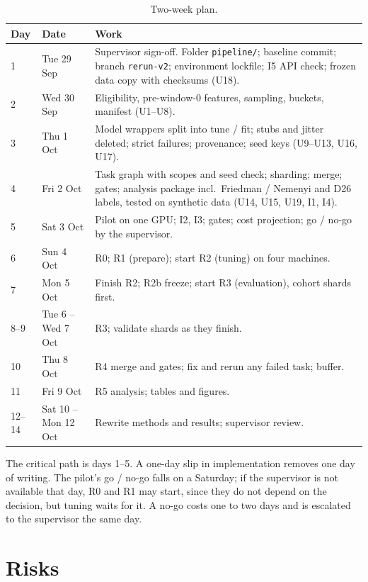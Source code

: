 \documentclass[11pt,a4paper]{article}
\newcommand{\code}[1]{\texttt{#1}}
\begin{document}
\begin{table}[h]
\centering\small
\caption{Two-week plan.}\label{tab:timeline}
\begin{tabularx}{\linewidth}{@{}l l X@{}}
\toprule
Day & Date & Work \\
\midrule
1 & Tue 29 Sep & Supervisor sign-off. Folder \code{pipeline/}; baseline commit; branch \code{rerun-v2}; environment lockfile; I5 API check; frozen data copy with checksums (U18). \\
2 & Wed 30 Sep & Eligibility, pre-window-0 features, sampling, buckets, manifest (U1--U8). \\
3 & Thu 1 Oct & Model wrappers split into tune / fit; stubs and jitter deleted; strict failures; provenance; seed keys (U9--U13, U16, U17). \\
4 & Fri 2 Oct & Task graph with scopes and seed check; sharding; merge; gates; analysis package incl.\ Friedman / Nemenyi and D26 labels, tested on synthetic data (U14, U15, U19, I1, I4). \\
5 & Sat 3 Oct & Pilot on one GPU; I2, I3; gates; cost projection; go / no-go by the supervisor. \\
6 & Sun 4 Oct & R0; R1 (prepare); start R2 (tuning) on four machines. \\
7 & Mon 5 Oct & Finish R2; R2b freeze; start R3 (evaluation), cohort shards first. \\
8--9 & Tue 6 -- Wed 7 Oct & R3; validate shards as they finish. \\
10 & Thu 8 Oct & R4 merge and gates; fix and rerun any failed task; buffer. \\
11 & Fri 9 Oct & R5 analysis; tables and figures. \\
12--14 & Sat 10 -- Mon 12 Oct & Rewrite methods and results; supervisor review. \\
\bottomrule
\end{tabularx}
\end{table}

The critical path is days 1--5. A one-day slip in implementation removes one day of writing. The
pilot's go / no-go falls on a Saturday; if the supervisor is not available that day, R0 and R1 may
start, since they do not depend on the decision, but tuning waits for it. A no-go costs one to two
days and is escalated to the supervisor the same day.

\section{Risks}\label{sec:risks}
\end{document}
